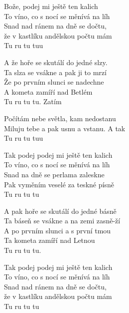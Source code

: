
\ve
{}Bože, podej mi ještě ten kalich \\
To víno, co s nocí se měnívá na líh\\
Snad nad ránem na dně se dočtu,\\
že v kastlíku andělskou počtu mám\\
Tu ru tu tuu

\ve
A že hoře se skutálí do jedné slzy.\\
Ta slza se vsákne a pak ji to mrzí\\
Že po prvním slunci se nadechne\\
A kometa zamíří nad Betlém\\
Tu ru tu tu. Zatím

\cho{}
Počítám nebe světla, kam nedostanu\\
Miluju tebe a pak usnu a vstanu. A tak\\
Tu ru tu tuu

\ve
Tak podej podej mi ještě ten kalich\\
To víno, co s nocí se měnívá na líh\\
Snad na dně se perlama zaleskne\\
Pak vyměním veselé za teskné písně\\
Tu ru tu tu

\ve
A pak hoře se skutálí do jedné básně\\
Ta báseň se vsákne a na zemi zasně-ží\\
A po prvním slunci a s první tmou\\
Ta kometa zamíří nad Letnou\\
Tu ru tu tu.

\cho

\ve
Tak podej podej mi ještě ten kalich\\
To víno, co s nocí se měnívá na líh\\
Snad nad ránem na dně se dočtu,\\
že v kastlíku andělskou počtu mám\\
Tu ru tu tu


\esong
